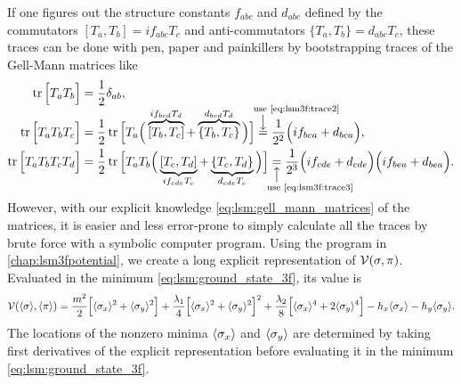 If one figures out the structure constants $f_{abc}$ and $d_{abc}$
defined by the commutators $[T_a,T_b]=i f_{abc} T_c$ and anti-commutators $\{T_a,T_b\}=d_{abc} T_c$,
these traces can be done with pen, paper and painkillers
by bootstrapping traces of the Gell-Mann matrices like
\begin{subequations}
\begin{align}
	\trace\Big[T_a T_b\Big] &= \frac{1}{2} \delta_{ab} \label{eq:lsm3f:trace2}, \\
	\trace\Big[T_a T_b T_c\Big] &= \frac{1}{2} \trace\Big[T_a\Big(\overbrace{[T_b,T_c]}^{\smash{i f_{bcd} T_d}}+\overbrace{\{T_b,T_c\}}^{\smash{d_{bcd} T_d}}\Big)\Big]
	                             \equalexplabove{\smash[t]{use \eqref{eq:lsm3f:trace2}}} \frac{1}{2^2} \Big( i f_{bca} + d_{bca} \Big), \label{eq:lsm3f:trace3} \\
	\trace\Big[T_a T_b T_c T_d\Big] &= \frac{1}{2} \trace\Big[T_a T_b \Big( \underbrace{[T_c,T_d]}_{\smash{i f_{cde} T_e}} + \underbrace{\{T_c,T_d\}}_{\smash{d_{cde} T_e}} \Big) \Big]
	                                 \equalexplbelow{\smash[b]{use \eqref{eq:lsm3f:trace3}}} \frac{1}{2^3} \Big( i f_{cde} + d_{cde} \Big) \Big( i f_{bea} + d_{bea} \Big). \label{eq:lsm3f:trace4}
\end{align}
\end{subequations}
However, with our explicit knowledge \eqref{eq:lsm:gell_mann_matrices} of the matrices,
it is easier and less error-prone to simply calculate all the traces by brute force with a symbolic computer program.
Using the program in \cref{chap:lsm3fpotential},
we create a long explicit representation of $\mathcal{V}(\sigma,\pi)$.
Evaluated in the minimum \eqref{eq:lsm:ground_state_3f}, its value is
\begin{equation}
	\mathcal{V}(\langle \sigma \rangle,\langle \pi \rangle) = \frac{m^2}{2} \Big[ \langle \sigma_x \rangle^2 + \langle \sigma_y \rangle^2 \Big] + \frac{\lambda_1}{4} \Big[ \langle \sigma_x \rangle^2 + \langle \sigma_y \rangle^2 \Big]^2 + \frac{\lambda_2}{8} \Big[ \langle \sigma_x \rangle^4 + 2 \langle \sigma_y \rangle^4 \Big] - h_x \langle \sigma_x \rangle - h_y \langle \sigma_y \rangle.
\label{eq:lsm:potential_tree_3f}
\end{equation}
The locations of the nonzero minima $\langle \sigma_x \rangle$ and $\langle \sigma_y \rangle$ are determined
by taking first derivatives of the explicit representation before evaluating it in the minimum \eqref{eq:lsm:ground_state_3f}.
